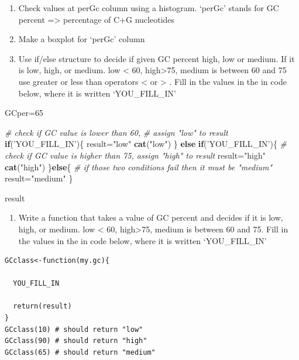 \documentclass[12pt,]{krantz}
\newenvironment{Shaded}{\begin{snugshade}}{\end{snugshade}}
\newcommand{\CommentTok}[1]{\textcolor[rgb]{0.56,0.35,0.01}{\textit{#1}}}
\newcommand{\ControlFlowTok}[1]{\textcolor[rgb]{0.13,0.29,0.53}{\textbf{#1}}}
\newcommand{\DecValTok}[1]{\textcolor[rgb]{0.00,0.00,0.81}{#1}}
\newcommand{\KeywordTok}[1]{\textcolor[rgb]{0.13,0.29,0.53}{\textbf{#1}}}
\newcommand{\NormalTok}[1]{#1}
\newcommand{\StringTok}[1]{\textcolor[rgb]{0.31,0.60,0.02}{#1}}
\providecommand{\tightlist}{%
  \setlength{\itemsep}{0pt}\setlength{\parskip}{0pt}}
\begin{document}
\begin{enumerate}
\def\labelenumi{\arabic{enumi}.}
\setcounter{enumi}{43}
\item
  Check values at perGc column using a histogram.
  `perGc' stands for GC percent =\textgreater{} percentage of C+G nucleotides
\item
  Make a boxplot for `perGc' column
\item
  Use if/else structure to decide if given GC percent high, low or medium.
  If it is low, high, or medium. low \textless{} 60, high\textgreater{}75, medium is between 60 and 75
  use greater or less than operators \textless{} or \textgreater{} .
  Fill in the values in the in code below, where it is written `YOU\_FILL\_IN'
\end{enumerate}

\begin{Shaded}
\begin{Highlighting}[]
\NormalTok{GCper=}\DecValTok{65}

  \CommentTok{# check if GC value is lower than 60, }
  \CommentTok{# assign "low" to result}
  \ControlFlowTok{if}\NormalTok{(}\StringTok{'YOU_FILL_IN'}\NormalTok{)\{}
\NormalTok{    result=}\StringTok{"low"}
    \KeywordTok{cat}\NormalTok{(}\StringTok{"low"}\NormalTok{)}
\NormalTok{  \}}
  \ControlFlowTok{else} \ControlFlowTok{if}\NormalTok{(}\StringTok{'YOU_FILL_IN'}\NormalTok{)\{  }\CommentTok{# check if GC value is higher than 75, assign "high" to result}
\NormalTok{    result=}\StringTok{"high"}
    \KeywordTok{cat}\NormalTok{(}\StringTok{"high"}\NormalTok{)}
\NormalTok{  \}}\ControlFlowTok{else}\NormalTok{\{ }\CommentTok{# if those two conditions fail then it must be "medium"}
\NormalTok{    result=}\StringTok{"medium"}
\NormalTok{  \}}

\NormalTok{result}
\end{Highlighting}
\end{Shaded}

\begin{enumerate}
\def\labelenumi{\arabic{enumi}.}
\setcounter{enumi}{43}
\tightlist
\item
  Write a function that takes a value of GC percent and decides
  if it is low, high, or medium. low \textless{} 60, high\textgreater{}75, medium is between 60 and 75.
  Fill in the values in the in code below, where it is written `YOU\_FILL\_IN'
\end{enumerate}

\begin{verbatim}
GCclass<-function(my.gc){
  
  YOU_FILL_IN
  
  return(result)
}
GCclass(10) # should return "low"
GCclass(90) # should return "high"
GCclass(65) # should return "medium"
\end{verbatim}
\end{document}
